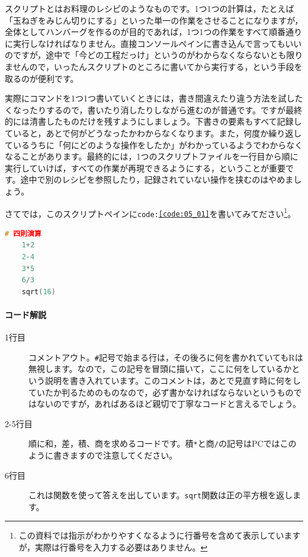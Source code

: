 \documentclass{ltjsbook}
\begin{document}
スクリプトとはお料理のレシピのようなものです。1つ1つの計算は，たとえば「玉ねぎをみじん切りにする」といった単一の作業をさせることになりますが，全体としてハンバーグを作るのが目的であれば，1つ1つの作業をすべて順番通りに実行しなければなりません。直接コンソールペインに書き込んで言ってもいいのですが，途中で「今どの工程だっけ」というのがわからなくならないとも限りませんので，いったんスクリプトのところに書いてから実行する，という手段を取るのが便利です。

実際にコマンドを1つ1つ書いていくときには，書き間違えたり違う方法を試したくなったりするので，書いたり消したりしながら進むのが普通です。ですが最終的には清書したものだけを残すようにしましょう。下書きの要素もすべて記録していると，あとで何がどうなったかわからなくなります。また，何度か繰り返しているうちに「何にどのような操作をしたか」がわかっているようでわからなくなることがあります。最終的には，1つのスクリプトファイルを一行目から順に実行していけば，すべての作業が再現できるようにする，ということが重要です。途中で別のレシピを参照したり，記録されていない操作を挟むのはやめましょう。

さてでは，このスクリプトペインに\texttt{code:\ref{code:05_01}}を書いてみてださい\footnote{この資料では指示がわかりやすくなるように行番号を含めて表示していますが，実際は行番号を入力する必要はありません。}。

\begin{lstlisting}[language=c++,label={code:05_01},caption={四則演算のコード}]
	# 四則演算
	1+2
	2-4
	3*5
	6/3
	sqrt(16)
\end{lstlisting}

\paragraph{コード解説}
\begin{description}
	\item[1行目] コメントアウト。\verb|#|記号で始まる行は，その後ろに何を書かれていてもRは無視します。なので，この記号を冒頭に描いて，ここに何をしているかという説明を書き入れています。このコメントは，あとで見直す時に何をしていたか判るためのものなので，必ず書かなければならないというものではないのですが，あればあるほど親切で丁寧なコードと言えるでしょう。
	\item[2-5行目] 順に和，差，積、商を求めるコードです。積\verb|*|と商\verb|/|の記号はPCではこのように書きますので注意してください。
	\item[6行目] これは関数を使って答えを出しています。\texttt{sqrt}関数は正の平方根を返します。
\end{description}
\end{document}

